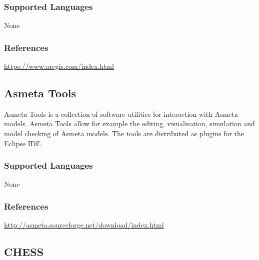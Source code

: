 \subsubsection{Supported Languages}

None


\subsubsection{References}

\url{https://www.arcgis.com/index.html}



\subsection{Asmeta Tools}
\label{subsecT:AsmetaTools}


Asmeta Tools is a collection of software utilities for interaction with Asmeta models. 
Asmeta Tools allow for example the editing, visualisation, simulation and model checking of Asmeta models.
The tools are distributed as plugins for the Eclipse IDE.


\subsubsection{Supported Languages}

None


\subsubsection{References}

\url{http://asmeta.sourceforge.net/download/index.html}



\subsection{CHESS}
\label{subsecT:CHESS}



